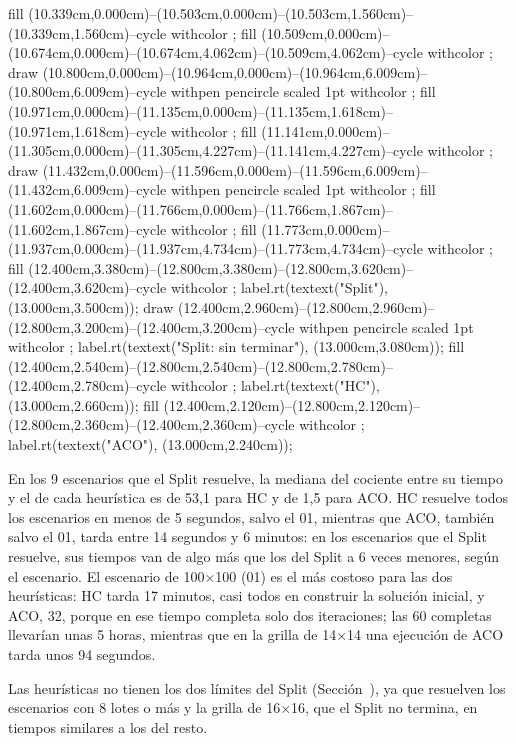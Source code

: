 {fill (10.339cm,0.000cm)--(10.503cm,0.000cm)--(10.503cm,1.560cm)--(10.339cm,1.560cm)--cycle withcolor ;
fill (10.509cm,0.000cm)--(10.674cm,0.000cm)--(10.674cm,4.062cm)--(10.509cm,4.062cm)--cycle withcolor ;
draw (10.800cm,0.000cm)--(10.964cm,0.000cm)--(10.964cm,6.009cm)--(10.800cm,6.009cm)--cycle withpen pencircle scaled 1pt withcolor ;
fill (10.971cm,0.000cm)--(11.135cm,0.000cm)--(11.135cm,1.618cm)--(10.971cm,1.618cm)--cycle withcolor ;
fill (11.141cm,0.000cm)--(11.305cm,0.000cm)--(11.305cm,4.227cm)--(11.141cm,4.227cm)--cycle withcolor ;
draw (11.432cm,0.000cm)--(11.596cm,0.000cm)--(11.596cm,6.009cm)--(11.432cm,6.009cm)--cycle withpen pencircle scaled 1pt withcolor ;
fill (11.602cm,0.000cm)--(11.766cm,0.000cm)--(11.766cm,1.867cm)--(11.602cm,1.867cm)--cycle withcolor ;
fill (11.773cm,0.000cm)--(11.937cm,0.000cm)--(11.937cm,4.734cm)--(11.773cm,4.734cm)--cycle withcolor ;
fill (12.400cm,3.380cm)--(12.800cm,3.380cm)--(12.800cm,3.620cm)--(12.400cm,3.620cm)--cycle withcolor ;
label.rt(textext("\tfx Split"), (13.000cm,3.500cm));
draw (12.400cm,2.960cm)--(12.800cm,2.960cm)--(12.800cm,3.200cm)--(12.400cm,3.200cm)--cycle withpen pencircle scaled 1pt withcolor ;
label.rt(textext("\tfx Split: sin terminar"), (13.000cm,3.080cm));
fill (12.400cm,2.540cm)--(12.800cm,2.540cm)--(12.800cm,2.780cm)--(12.400cm,2.780cm)--cycle withcolor ;
label.rt(textext("\tfx HC"), (13.000cm,2.660cm));
fill (12.400cm,2.120cm)--(12.800cm,2.120cm)--(12.800cm,2.360cm)--(12.400cm,2.360cm)--cycle withcolor ;
label.rt(textext("\tfx ACO"), (13.000cm,2.240cm));
\stopMPcode}

En los 9 escenarios que el Split resuelve, la mediana del cociente entre su
tiempo y el de cada heurística es de 53,1 para HC y de 1,5 para ACO. HC
resuelve todos los escenarios en menos de 5 segundos, salvo el 01, mientras
que ACO, también salvo el 01, tarda entre 14 segundos y 6 minutos: en los escenarios que el Split resuelve, sus
tiempos van de algo más que los del Split a 6 veces menores, según el escenario. El
escenario de 100×100 (01) es el más costoso para las dos heurísticas: HC
tarda 17 minutos, casi todos en construir la solución inicial, y ACO, 32,
porque en ese tiempo completa solo dos iteraciones; las 60 completas
llevarían unas 5 horas, mientras que en la grilla de 14×14 una ejecución de
ACO tarda unos 94 segundos.

Las heurísticas no tienen los dos límites del Split
(Sección~), ya que resuelven los escenarios con 8 lotes
o más y la grilla de 16×16, que el Split no termina, en tiempos similares a
los del resto.

